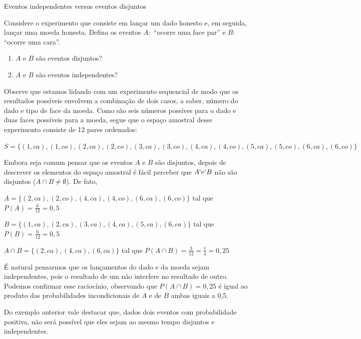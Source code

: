 \begin{example}{Eventos independentes versus eventos disjuntos}

Considere o experimento que consiste em lançar um dado honesto e, em seguida, lançar uma moeda honesta. Defina os eventos \(A:\) “ocorre uma face par” e \(B:\) “ocorre uma cara”.
\begin{enumerate}
\item {} 
\(A\) e \(B\) são eventos disjuntos?

\item {} 
\(A\) e \(B\) são eventos independentes?

\end{enumerate}

Observe que estamos lidando com um experimento sequencial de modo que os resultados possíveis envolvem a combinação de dois casos, a saber, número do dado e tipo de face da moeda. Como são seis números possíves para o dado e duas faces possíveis para a moeda, segue que o espaço amostral desse experimento consiste de 12 pares ordenados:

\(S=\{(1,ca),(1,co),(2,ca),(2,co),(3,ca),(3,co),(4,ca),(4,co),(5,ca),(5,co),(6,ca),(6,co)\}\)

Embora seja comum pensar que os eventos \(A\) e \(B\) são disjuntos, depois de descrever os elementos do espaço amostral é fácil perceber que \(A`e  `B\) não são disjuntos (\(A\cap B\neq \emptyset\)). De fato,

\(A=\{(2,ca),(2,co),(4,ca),(4,co),(6,ca),(6,co)\}\) tal que \(P(A)=\frac{6}{12}=0,5\)

\(B=\{(1,ca),(2,ca),(3,ca),(4,ca),(5,ca),(6,ca)\}\) tal que \(P(B)=\frac{6}{12}=0,5\)

\(A\cap B=\{(2,ca),(4,ca),(6,ca)\}\) tal que \(P(A\cap B)=\frac{3}{12}=\frac{1}{4}=0,25\)

É natural pensarmos que os lançamentos do dado e da moeda sejam independentes, pois o resultado de um não interfere no resultado de outro. Podemos confirmar esse raciocínio, observando que \(P(A\cap B)=0,25\) é igual ao produto das probabilidades incondicionais de \(A\) e de \(B\)  ambas iguais a 0,5.
\end{example}

Do exemplo anterior vale destacar que, dados dois eventos com probabilidade positiva, não será possível que eles sejam ao mesmo tempo disjuntos e independentes.

